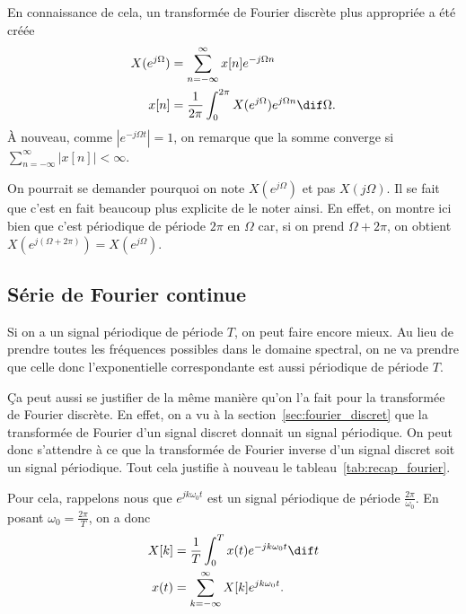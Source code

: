 En connaissance de cela, un transformée de Fourier discrète plus appropriée
a été créée
\begin{align*}
  X(e^{j\Omega}) & = \sum_{n=-\infty}^\infty x[n]e^{-j\Omega n}\\
  x[n] & = \frac{1}{2\pi}
  \int_{0}^{2\pi} X(e^{j\Omega})e^{j\Omega n} \dif \Omega.
\end{align*}
À nouveau, comme $|e^{-j\Omega t}| = 1$, on remarque que la somme
converge si $\sum_{n=-\infty}^\infty |x[n]| < \infty$.

On pourrait se demander pourquoi on note $X(e^{j\Omega})$ et pas $X(j\Omega)$.
Il se fait que c'est en fait beaucoup plus explicite de le noter ainsi.
En effet, on montre ici bien que c'est périodique de période $2\pi$
en $\Omega$ car, si on prend $\Omega + 2\pi$,
on obtient $X(e^{j(\Omega + 2\pi)}) = X(e^{j\Omega})$.

\subsection{Série de Fourier continue}
Si on a un signal périodique de période $T$, on peut faire encore mieux.
Au lieu de prendre toutes les fréquences possibles dans le domaine spectral,
on ne va prendre que celle donc l'exponentielle correspondante est
aussi périodique de période $T$.

Ça peut aussi se justifier de la même manière qu'on l'a fait pour
la transformée de Fourier discrète.
En effet, on a vu à la section~\ref{sec:fourier_discret}
que la transformée de Fourier d'un signal discret
donnait un signal périodique.
On peut donc s'attendre à ce que la transformée de Fourier inverse d'un
signal discret soit un signal périodique.
Tout cela justifie à nouveau le tableau~\ref{tab:recap_fourier}.

Pour cela, rappelons nous que $e^{jk\omega_0t}$ est un signal périodique
de période $\frac{2\pi}{\omega_0}$.
En posant $\omega_0 = \frac{2\pi}{T}$, on a donc
\begin{align}
  \label{eq:sfc}
  X[k] & = \frac{1}{T}\int_0^T x(t) e^{-jk\omega_0t} \dif t\\
  \label{eq:sfci}
  x(t) & = \sum_{k=-\infty}^\infty X[k]e^{jk\omega_0t}.
\end{align}

